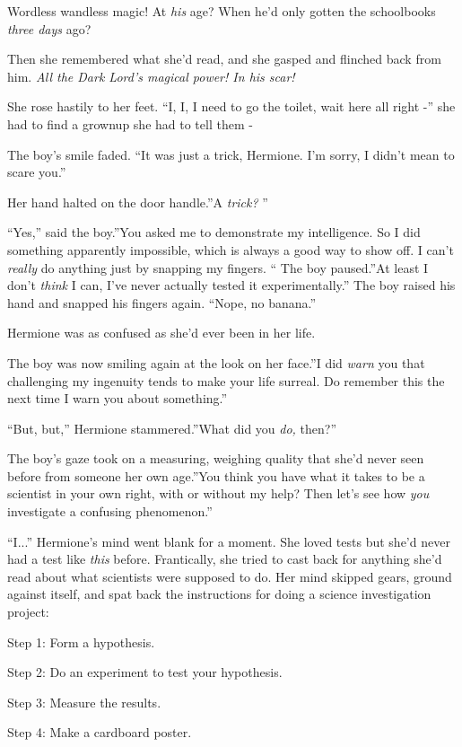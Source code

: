Wordless wandless magic! At \emph{his} age? When he'd only gotten the
schoolbooks \emph{three days} ago?

Then she remembered what she'd read, and she gasped and flinched back
from him. \emph{All the Dark Lord's magical power! In his scar!}

She rose hastily to her feet. ``I, I, I need to go the toilet, wait here
all right -'' she had to find a grownup she had to tell them -

The boy's smile faded. ``It was just a trick, Hermione. I'm sorry, I
didn't mean to scare you.''

Her hand halted on the door handle.''A \emph{trick?} ''

``Yes,'' said the boy.''You asked me to demonstrate my intelligence. So
I did something apparently impossible, which is always a good way to
show off. I can't \emph{really} do anything just by snapping my fingers.
`` The boy paused.''At least I don't \emph{think} I can, I've never
actually tested it experimentally.'' The boy raised his hand and snapped
his fingers again. ``Nope, no banana.''

Hermione was as confused as she'd ever been in her life.

The boy was now smiling again at the look on her face.''I did
\emph{warn} you that challenging my ingenuity tends to make your life
surreal. Do remember this the next time I warn you about something.''

``But, but,'' Hermione stammered.''What did you \emph{do,} then?''

The boy's gaze took on a measuring, weighing quality that she'd never
seen before from someone her own age.''You think you have what it takes
to be a scientist in your own right, with or without my help? Then let's
see how \emph{you} investigate a confusing phenomenon.''

``I...'' Hermione's mind went blank for a moment. She loved tests
but she'd never had a test like \emph{this} before. Frantically, she
tried to cast back for anything she'd read about what scientists were
supposed to do. Her mind skipped gears, ground against itself, and spat
back the instructions for doing a science investigation project:

Step 1: Form a hypothesis.

Step 2: Do an experiment to test your hypothesis.

Step 3: Measure the results.

Step 4: Make a cardboard poster.

